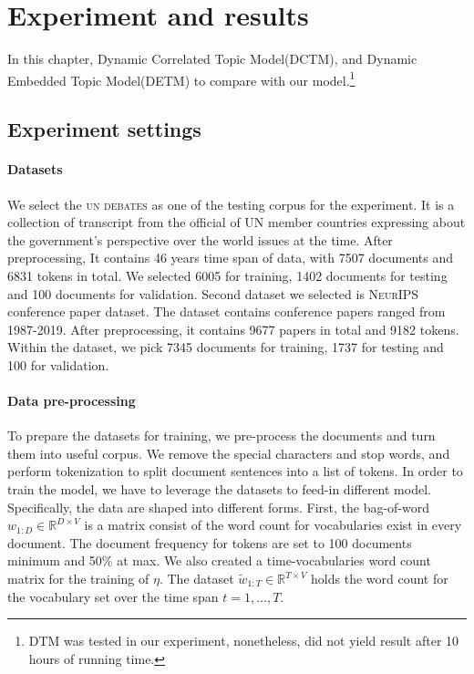 \section{Experiment and results}
In this chapter, Dynamic Correlated Topic Model(DCTM)\cite{tomasi_stochastic_nodate}, and Dynamic Embedded Topic Model(DETM)\cite{dieng_dynamic_2019} to compare with our model.\footnote{DTM was tested in our experiment, nonetheless, did not yield result after 10 hours of running time.}
\subsection{Experiment settings}
\paragraph{Datasets}
We select the \textsc{un debates} as one of the testing corpus for the experiment. It is a collection of transcript from the official of UN member countries expressing about the  government's perspective over the world issues at the time.
After preprocessing, It contains 46 years time span of data, with 7507 documents and 6831 tokens in total. We selected 6005 for training, 1402 documents for testing and 100 documents for validation.
Second dataset we selected is \textsc{NeurIPS} conference paper dataset. The dataset contains conference papers ranged from 1987-2019. After preprocessing, it contains 9677 papers in total and 9182 tokens. Within the dataset, we pick 7345 documents for training, 1737 for testing and 100 for validation.
\paragraph{Data pre-processing}
To prepare the datasets for training, we pre-process the documents and turn them into useful corpus.
We remove the special characters and stop words, and perform tokenization to split document sentences into a list of tokens. 
In order to train the model, we have to leverage the datasets to feed-in different model. Specifically, the data are shaped into different forms.
First, the bag-of-word $ w_{1:D}\in\mathbb{R}^{D\times V} $ is a matrix consist of the word count for vocabularies exist in every document. The document frequency for tokens are set to 100 documents minimum and 50\% at max.
We also created a time-vocabularies word count matrix for the training of $ \eta $. The dataset $ \tilde{w}_{1:T}\in\mathbb{R}^{T\times V} $ holds the word count for the vocabulary set over the time span $ t=1,\dots,T $.
